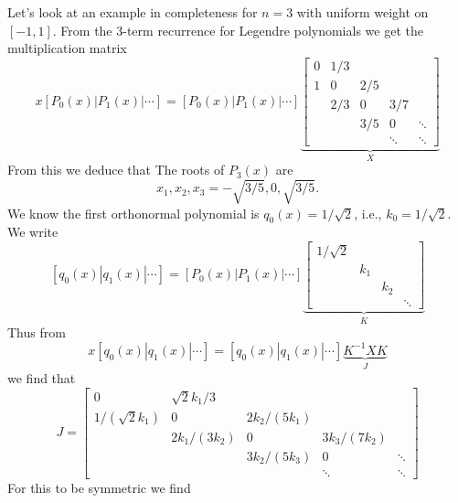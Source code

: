 \begin{example} Let's look at an example in completeness for $n = 3$ with uniform weight on $[-1,1]$. From the 3-term recurrence for Legendre polynomials we get the multiplication matrix
\[
x [P_0(x) | P_1(x) | \ensuremath{\cdots} ] = [P_0(x) | P_1(x) | \ensuremath{\cdots} ] \underbrace{\begin{bmatrix} 0 & 1/3\\
                                1 & 0 & 2/5 \\
                                    &2/3 & 0 & 3/7 \\
                                    && 3/5 & 0 & \ensuremath{\ddots} \\
                                    &&& \ensuremath{\ddots} & \ensuremath{\ddots}
                                    \end{bmatrix}}_X
\]
From this we deduce that
The roots of $P_3(x)$ are
\[
x_1,x_2,x_3 = -\sqrt{3/5}, 0, \sqrt{3/5}.
\]
We know the first orthonormal polynomial is $q_0(x) = 1/\sqrt{2}$, i.e., $k_0 = 1/\sqrt{2}$. We write
\[
[q_0(x) | q_1(x) | \ensuremath{\cdots} ] = [P_0(x) | P_1(x) | \ensuremath{\cdots} ] \underbrace{\begin{bmatrix} 1/\sqrt{2} \\ & k_1 \\ && k_2 \\ &&&\ensuremath{\ddots} \end{bmatrix}}_K
\]
Thus from
\[
x [q_0(x) | q_1(x) | \ensuremath{\cdots} ] = [q_0(x) | q_1(x) | \ensuremath{\cdots} ] \underbrace{K^{-1} X K}_J
\]
we find that
\[
J = \begin{bmatrix} 0 & \sqrt{2}k_1/3 \\
                                1/(\sqrt{2}k_1) & 0 & 2k_2/(5k_1) \\
                                    &2k_1/(3k_2) & 0 & 3k_3/(7k_2) \\
                                    && 3k_2/(5k_3) & 0 & \ensuremath{\ddots} \\
                                    &&& \ensuremath{\ddots} & \ensuremath{\ddots}
                                    \end{bmatrix}
\]
For this to be symmetric we find
\end{example}
